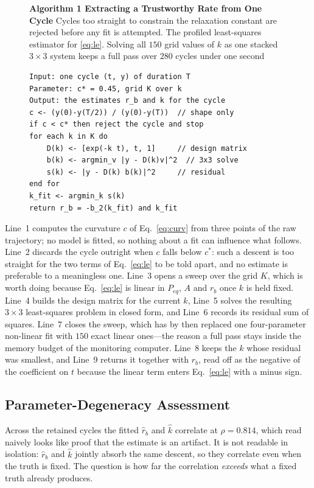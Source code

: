 \documentclass[runningheads]{llncs}
\newcommand{\rb}{\ensuremath{r_{b}}}
\newcommand{\rbh}{\ensuremath{\hat{r}_{b}}}
\newcommand{\kh}{\ensuremath{\hat{k}}}
\begin{document}
\begin{figure}[t]
\noindent\textbf{Algorithm 1  Extracting a Trustworthy Rate from One Cycle} Cycles too straight to constrain the relaxation constant are rejected before any fit is attempted. The profiled
least-squares estimator for \eqref{eq:le}. Solving all $150$ grid
values of $k$ as one stacked $3\times3$ system keeps a full pass over
$280$ cycles under one second

\begin{verbatim}
Input: one cycle (t, y) of duration T
Parameter: c* = 0.45, grid K over k
Output: the estimates r_b and k for the cycle
c <- (y(0)-y(T/2)) / (y(0)-y(T))  // shape only
if c < c* then reject the cycle and stop
for each k in K do
    D(k) <- [exp(-k t), t, 1]     // design matrix
    b(k) <- argmin_v |y - D(k)v|^2  // 3x3 solve
    s(k) <- |y - D(k) b(k)|^2     // residual
end for
k_fit <- argmin_k s(k)
return r_b = -b_2(k_fit) and k_fit
\end{verbatim}

\end{figure}

Line~1 computes the curvature
$c$ of Eq.~\eqref{eq:curv} from three points of the raw trajectory; no
model is fitted, so nothing about a fit can influence what follows.
Line~2 discards the cycle outright when $c$ falls below $c^{*}$: such a
descent is too straight for the two terms of Eq.~\eqref{eq:le} to be
told apart, and no estimate is preferable to a meaningless one.
Line~3 opens a sweep over the grid $K$, which is worth doing because
Eq.~\eqref{eq:le} is linear in $P_{eq}$, $A$ and \rb{} once $k$ is
held fixed. Line~4 builds the design matrix for the current $k$,
Line~5 solves the resulting $3\times3$ least-squares problem in closed
form, and Line~6 records its residual sum of squares. Line~7 closes
the sweep, which has by then replaced one four-parameter non-linear
fit with $150$ exact linear ones---the reason a full pass stays inside
the memory budget of the monitoring computer. Line~8 keeps the $k$
whose residual was smallest, and Line~9 returns it together with
\rb{}, read off as the negative of the coefficient on $t$ because the
linear term enters Eq.~\eqref{eq:le} with a minus sign.

\subsection{Parameter-Degeneracy Assessment}

Across the retained cycles the fitted \rbh{} and \kh{} correlate at
$\rho=0.814$, which read naively looks like proof that the estimate is
an artifact. It is not readable in isolation: \rbh{} and \kh{} jointly
absorb the same descent, so they correlate even when the truth is
fixed. The question is how far the correlation \emph{exceeds} what a
fixed truth already produces.
\end{document}
